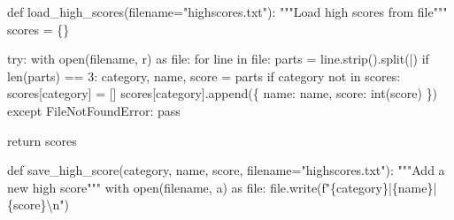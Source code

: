 \documentclass[
  letterpaper,
  DIV=11,
  numbers=noendperiod,
  oneside]{scrreprt}
\newenvironment{Shaded}{}{}
\newcommand{\BuiltInTok}[1]{\textcolor[rgb]{0.84,0.23,0.29}{#1}}
\newcommand{\CharTok}[1]{\textcolor[rgb]{0.01,0.18,0.38}{#1}}
\newcommand{\CommentTok}[1]{\textcolor[rgb]{0.42,0.45,0.49}{#1}}
\newcommand{\ControlFlowTok}[1]{\textcolor[rgb]{0.84,0.23,0.29}{#1}}
\newcommand{\DecValTok}[1]{\textcolor[rgb]{0.00,0.36,0.77}{#1}}
\newcommand{\ImportTok}[1]{\textcolor[rgb]{0.01,0.18,0.38}{#1}}
\newcommand{\KeywordTok}[1]{\textcolor[rgb]{0.84,0.23,0.29}{#1}}
\newcommand{\NormalTok}[1]{\textcolor[rgb]{0.14,0.16,0.18}{#1}}
\newcommand{\OperatorTok}[1]{\textcolor[rgb]{0.14,0.16,0.18}{#1}}
\newcommand{\PreprocessorTok}[1]{\textcolor[rgb]{0.84,0.23,0.29}{#1}}
\newcommand{\SpecialCharTok}[1]{\textcolor[rgb]{0.00,0.36,0.77}{#1}}
\newcommand{\SpecialStringTok}[1]{\textcolor[rgb]{0.01,0.18,0.38}{#1}}
\newcommand{\StringTok}[1]{\textcolor[rgb]{0.01,0.18,0.38}{#1}}
\begin{document}
\begin{Shaded}
\begin{Highlighting}[]
\KeywordTok{def}\NormalTok{ load\_high\_scores(filename}\OperatorTok{=}\StringTok{"highscores.txt"}\NormalTok{):}
    \CommentTok{"""Load high scores from file"""}
\NormalTok{    scores }\OperatorTok{=}\NormalTok{ \{\}}
    
    \ControlFlowTok{try}\NormalTok{:}
        \ControlFlowTok{with} \BuiltInTok{open}\NormalTok{(filename, }\StringTok{\textquotesingle{}r\textquotesingle{}}\NormalTok{) }\ImportTok{as} \BuiltInTok{file}\NormalTok{:}
            \ControlFlowTok{for}\NormalTok{ line }\KeywordTok{in} \BuiltInTok{file}\NormalTok{:}
\NormalTok{                parts }\OperatorTok{=}\NormalTok{ line.strip().split(}\StringTok{\textquotesingle{}|\textquotesingle{}}\NormalTok{)}
                \ControlFlowTok{if} \BuiltInTok{len}\NormalTok{(parts) }\OperatorTok{==} \DecValTok{3}\NormalTok{:}
\NormalTok{                    category, name, score }\OperatorTok{=}\NormalTok{ parts}
                    \ControlFlowTok{if}\NormalTok{ category }\KeywordTok{not} \KeywordTok{in}\NormalTok{ scores:}
\NormalTok{                        scores[category] }\OperatorTok{=}\NormalTok{ []}
\NormalTok{                    scores[category].append(\{}
                        \StringTok{\textquotesingle{}name\textquotesingle{}}\NormalTok{: name,}
                        \StringTok{\textquotesingle{}score\textquotesingle{}}\NormalTok{: }\BuiltInTok{int}\NormalTok{(score)}
\NormalTok{                    \})}
    \ControlFlowTok{except} \PreprocessorTok{FileNotFoundError}\NormalTok{:}
        \ControlFlowTok{pass}
        
    \ControlFlowTok{return}\NormalTok{ scores}

\KeywordTok{def}\NormalTok{ save\_high\_score(category, name, score, filename}\OperatorTok{=}\StringTok{"highscores.txt"}\NormalTok{):}
    \CommentTok{"""Add a new high score"""}
    \ControlFlowTok{with} \BuiltInTok{open}\NormalTok{(filename, }\StringTok{\textquotesingle{}a\textquotesingle{}}\NormalTok{) }\ImportTok{as} \BuiltInTok{file}\NormalTok{:}
        \BuiltInTok{file}\NormalTok{.write(}\SpecialStringTok{f"}\SpecialCharTok{\{}\NormalTok{category}\SpecialCharTok{\}}\SpecialStringTok{|}\SpecialCharTok{\{}\NormalTok{name}\SpecialCharTok{\}}\SpecialStringTok{|}\SpecialCharTok{\{}\NormalTok{score}\SpecialCharTok{\}}\CharTok{\textbackslash{}n}\SpecialStringTok{"}\NormalTok{)}
\end{Highlighting}
\end{Shaded}
\end{document}
